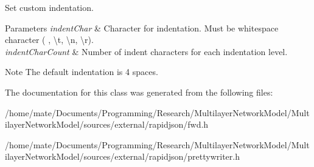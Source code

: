 Set custom indentation. 


\begin{DoxyParams}{Parameters}
{\em indent\+Char} & Character for indentation. Must be whitespace character (\textquotesingle{} \textquotesingle{}, \textquotesingle{}\textbackslash{}t\textquotesingle{}, \textquotesingle{}\textbackslash{}n\textquotesingle{}, \textquotesingle{}\textbackslash{}r\textquotesingle{}). \\
\hline
{\em indent\+Char\+Count} & Number of indent characters for each indentation level. \\
\hline
\end{DoxyParams}
\begin{DoxyNote}{Note}
The default indentation is 4 spaces. 
\end{DoxyNote}


The documentation for this class was generated from the following files\+:\begin{DoxyCompactItemize}
\item 
/home/mate/\+Documents/\+Programming/\+Research/\+Multilayer\+Network\+Model/\+Multilayer\+Network\+Model/sources/external/rapidjson/fwd.\+h\item 
/home/mate/\+Documents/\+Programming/\+Research/\+Multilayer\+Network\+Model/\+Multilayer\+Network\+Model/sources/external/rapidjson/prettywriter.\+h\end{DoxyCompactItemize}

